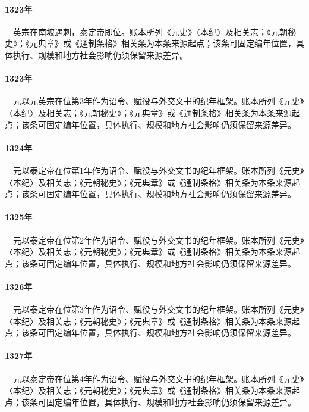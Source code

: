 \paragraph{1323年}　英宗在南坡遇刺，泰定帝即位。账本所列《元史》〈本纪〉及相关志；《元朝秘史》；《元典章》或《通制条格》相关条为本条来源起点；该条可固定编年位置，具体执行、规模和地方社会影响仍须保留来源差异。

\paragraph{1323年}　元以元英宗在位第3年作为诏令、赋役与外交文书的纪年框架。账本所列《元史》〈本纪〉及相关志；《元朝秘史》；《元典章》或《通制条格》相关条为本条来源起点；该条可固定编年位置，具体执行、规模和地方社会影响仍须保留来源差异。

\paragraph{1324年}　元以泰定帝在位第1年作为诏令、赋役与外交文书的纪年框架。账本所列《元史》〈本纪〉及相关志；《元朝秘史》；《元典章》或《通制条格》相关条为本条来源起点；该条可固定编年位置，具体执行、规模和地方社会影响仍须保留来源差异。

\paragraph{1325年}　元以泰定帝在位第2年作为诏令、赋役与外交文书的纪年框架。账本所列《元史》〈本纪〉及相关志；《元朝秘史》；《元典章》或《通制条格》相关条为本条来源起点；该条可固定编年位置，具体执行、规模和地方社会影响仍须保留来源差异。

\paragraph{1326年}　元以泰定帝在位第3年作为诏令、赋役与外交文书的纪年框架。账本所列《元史》〈本纪〉及相关志；《元朝秘史》；《元典章》或《通制条格》相关条为本条来源起点；该条可固定编年位置，具体执行、规模和地方社会影响仍须保留来源差异。

\paragraph{1327年}　元以泰定帝在位第4年作为诏令、赋役与外交文书的纪年框架。账本所列《元史》〈本纪〉及相关志；《元朝秘史》；《元典章》或《通制条格》相关条为本条来源起点；该条可固定编年位置，具体执行、规模和地方社会影响仍须保留来源差异。

